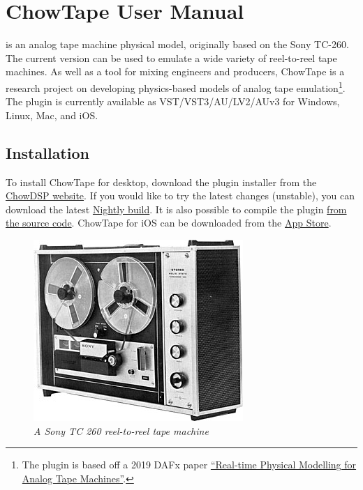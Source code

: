 \documentclass[landscape,twocolumn,a5paper]{manual}
\begin{document}
\section{ChowTape User Manual}

\noindent
{} is an analog tape machine physical model,
originally based on the Sony TC-260. The current version
can be used to emulate a wide variety of reel-to-reel tape
machines. As well as a tool for mixing engineers and producers,
ChowTape is a research project on developing physics-based
models of analog tape emulation\footnote{The plugin is based off a 2019 DAFx paper
\href{http://dafx2019.bcu.ac.uk/papers/DAFx2019_paper_3.pdf}{``Real-time Physical Modelling for Analog Tape Machines''}.}.
The plugin is currently available as VST/VST3/AU/LV2/AUv3 for
Windows, Linux, Mac, and iOS.

\subsection{Installation}
To install ChowTape for desktop, download the plugin installer
from the \href{https://chowdsp.com/products.html#tape}{ChowDSP website}.
If you would like to try the latest changes (unstable), you can
download the latest \href{https://chowdsp.com/nightly.html}{Nightly build}.
It is also possible to compile the plugin
\href{https://github.com/jatinchowdhury18/AnalogTapeModel/blob/master/BUILDING.md}{from the source code}.
ChowTape for iOS can be downloaded from the
\href{https://apps.apple.com/us/app/chowtapemodel/id1557806564}{App Store}.

\begin{figure}[ht]
    \center
    \includegraphics[width=0.45\columnwidth]{sony_tc-260.jpg}
    \caption{\label{TapeMachine}{\it A Sony TC 260 reel-to-reel tape machine}}
\end{figure}
\end{document}
